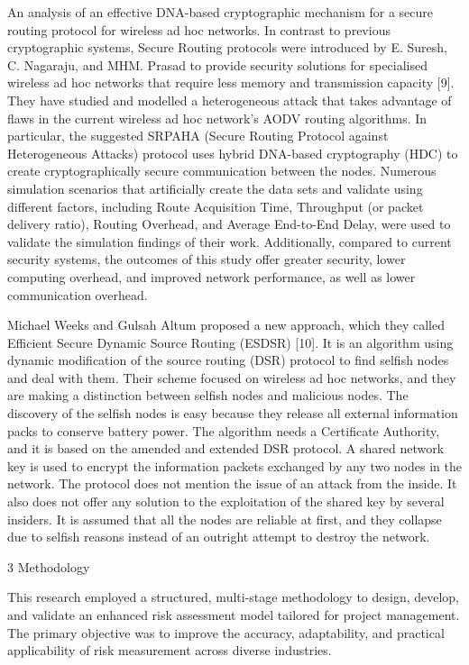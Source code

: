 \documentclass{default}
\begin{document}
An analysis of an effective DNA-based cryptographic mechanism for a secure routing protocol for wireless ad hoc networks. In contrast to previous cryptographic systems, Secure Routing protocols were introduced by E. Suresh, C. Nagaraju, and MHM. Prasad to provide security solutions for specialised wireless ad hoc networks that require less memory and transmission capacity [9]. They have studied and modelled a heterogeneous attack that takes advantage of flaws in the current wireless ad hoc network's AODV routing algorithms. In particular, the suggested SRPAHA (Secure Routing Protocol against Heterogeneous Attacks) protocol uses hybrid DNA-based cryptography (HDC) to create cryptographically secure communication between the nodes. Numerous simulation scenarios that artificially create the data sets and validate using different factors, including Route Acquisition Time, Throughput (or packet delivery ratio), Routing Overhead, and Average End-to-End Delay, were used to validate the simulation findings of their work. Additionally, compared to current security systems, the outcomes of this study offer greater security, lower computing overhead, and improved network performance, as well as lower communication overhead.

Michael Weeks and Gulsah Altum proposed a new approach, which they called Efficient Secure Dynamic Source Routing (ESDSR) [10]. It is an algorithm using dynamic modification of the source routing (DSR) protocol to find selfish nodes and deal with them. Their scheme focused on wireless ad hoc networks, and they are making a distinction between selfish nodes and malicious nodes. The discovery of the selfish nodes is easy because they release all external information packs to conserve battery power. The algorithm needs a Certificate Authority, and it is based on the amended and extended DSR protocol. A shared network key is used to encrypt the information packets exchanged by any two nodes in the network. The protocol does not mention the issue of an attack from the inside. It also does not offer any solution to the exploitation of the shared key by several insiders. It is assumed that all the nodes are reliable at first, and they collapse due to selfish reasons instead of an outright attempt to destroy the network.

3 Methodology

This research employed a structured, multi-stage methodology to design, develop, and validate an enhanced risk assessment model tailored for project management. The primary objective was to improve the accuracy, adaptability, and practical applicability of risk measurement across diverse industries.
\end{document}
